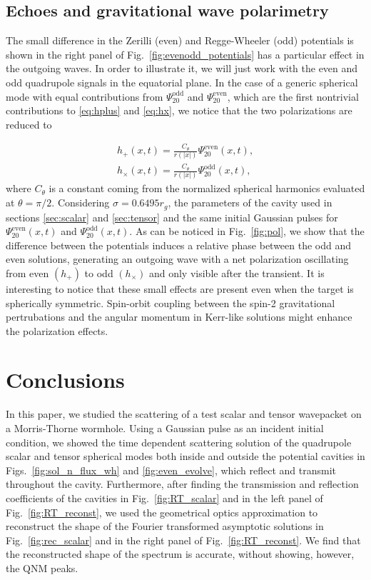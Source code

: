 \documentclass[article,aps,nofootinbib,twocolumn,superscriptaddress]{revtex4-1}
\begin{document}
\subsection{Echoes and gravitational wave polarimetry}
\label{sec:Subsec_Polar}

The small difference in the Zerilli (even) and Regge-Wheeler (odd) potentials is shown in the right panel of Fig.~\ref{fig:evenodd_potentials} has a particular effect in the outgoing waves. In order to illustrate it, we will just work with the even and odd quadrupole signals in the equatorial plane. In the case of a generic spherical mode with equal contributions from $\Psi^{\mathrm{odd}}_{20}$ and $\Psi^{\mathrm{even}}_{20} $, which are the first nontrivial contributions to \eqref{eq:hplus} and \eqref{eq:hx}, we notice that the two polarizations are reduced to

\begin{eqnarray}
h_+(x,t)=\frac{C_{\theta}}{r(|x|)}\Psi^{\mathrm{even}}_{20}(x,t),\nonumber\\
h_{\times}(x,t)=\frac{C_{\theta}}{r(|x|)}\Psi^{\mathrm{odd}}_{20}(x,t),\label{eq:pols}
\end{eqnarray}
where $C_{\theta}$ is a constant coming from the normalized spherical harmonics evaluated at $\theta=\pi/2$. Considering $\sigma=0.6495 r_g$, the parameters of the cavity used in sections \ref{sec:scalar} and \ref{sec:tensor} and the same initial Gaussian pulses for $\Psi^{\mathrm{even}}_{20}(x,t)$ and $\Psi^{\mathrm{odd}}_{20}(x,t)$.  As can be noticed in Fig.~\ref{fig:pol}, we show that the difference between the potentials induces a relative phase between the odd and even solutions, generating an outgoing wave with a net polarization oscillating from even $(h_+)$ to odd $(h_{\times})$ and only visible after the transient. It is interesting to notice that these small effects are present even when the target is spherically symmetric. Spin-orbit coupling between the spin-2 gravitational pertrubations and the angular momentum in Kerr-like solutions might enhance the polarization effects.
  
\section{Conclusions}\label{sec:conclusions}
In this paper, we studied the scattering of a test scalar and tensor wavepacket on a Morris-Thorne wormhole. Using a Gaussian pulse as an incident initial condition, we showed the time dependent scattering solution of the quadrupole scalar and tensor spherical modes both inside and outside the potential cavities in Figs.~\ref{fig:sol_n_flux_wh} and \ref{fig:even_evolve}, which reflect and transmit throughout the cavity. Furthermore, after finding the transmission and reflection coefficients of the cavities in Fig.~\ref{fig:RT_scalar} and in the left panel of Fig.~\ref{fig:RT_reconst}, we used the geometrical optics approximation to reconstruct the shape of the Fourier transformed asymptotic solutions in Fig.~\ref{fig:rec_scalar} and in the right panel of Fig.~\ref{fig:RT_reconst}. We find that the reconstructed shape of the spectrum is accurate, without showing, however, the QNM peaks.
\end{document}

